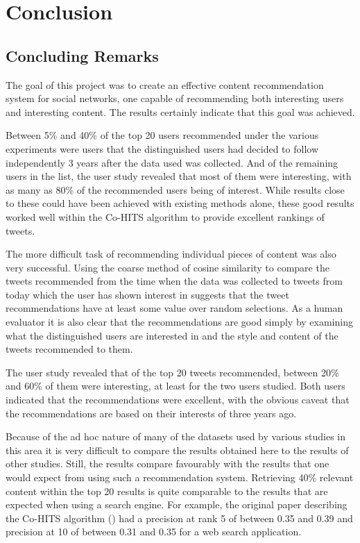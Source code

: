 \chapter{Conclusion}

\section{Concluding Remarks}

The goal of this project was to create an effective content recommendation system for social networks, one capable of recommending both interesting users and interesting content. The results certainly indicate that this goal was achieved.

Between 5\% and 40\% of the top 20 users recommended under the various experiments were users that the distinguished users had decided to follow independently 3 years after the data used was collected. And of the remaining users in the list, the user study revealed that most of them were interesting, with as many as 80\% of the recommended users being of interest. While results close to these could have been achieved with existing methods alone, these good results worked well within the Co-HITS algorithm to provide excellent rankings of tweets.

The more difficult task of recommending individual pieces of content was also very successful. Using the coarse method of cosine similarity to compare the tweets recommended from the time when the data was collected to tweets from today which the user has shown interest in suggests that the tweet recommendations have at least some value over random selections. As a human evaluator it is also clear that the recommendations are good simply by examining what the distinguished users are interested in and the style and content of the tweets recommended to them.

The user study revealed that of the top 20 tweets recommended, between 20\% and 60\% of them were interesting, at least for the two users studied. Both users indicated that the recommendations were excellent, with the obvious caveat that the recommendations are based on their interests of three years ago.

Because of the ad hoc nature of many of the datasets used by various studies in this area it is very difficult to compare the results obtained here to the results of other studies. Still, the results compare favourably with the results that one would expect from using such a recommendation system. Retrieving 40\% relevant content within the top 20 results is quite comparable to the results that are expected when using a search engine. For example, the original paper describing the Co-HITS algorithm (\cite{Deng2009}) had a precision at rank 5 of between 0.35 and 0.39 and precision at 10 of between 0.31 and 0.35 for a web search application.

